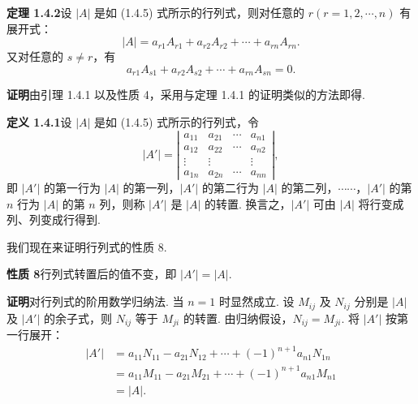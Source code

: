 \documentclass[UTF8,12pt,a4paper,fontset=fandol]{ctexart}
\begin{document}
\noindent\textbf{定理 1.4.2}\quad 设 $|A|$ 是如 (1.4.5) 式所示的行列式，则对任意的 $r(r=1,2,\cdots,n)$ 有展开式：
\begin{equation}
|A|=a_{r1}A_{r1}+a_{r2}A_{r2}+\cdots+a_{rn}A_{rn}.
\tag{1.4.6}
\end{equation}
又对任意的 $s\ne r$，有
\begin{equation}
a_{r1}A_{s1}+a_{r2}A_{s2}+\cdots+a_{rn}A_{sn}=0.
\tag{1.4.7}
\end{equation}

\noindent\textbf{证明}\quad 由引理 1.4.1 以及性质 4，采用与定理 1.4.1 的证明类似的方法即得.

\noindent\textbf{定义 1.4.1}\quad 设 $|A|$ 是如 (1.4.5) 式所示的行列式，令
\[
|A'|=
\left|\begin{array}{cccc}
a_{11} & a_{21} & \cdots & a_{n1}\\
a_{12} & a_{22} & \cdots & a_{n2}\\
\vdots & \vdots & & \vdots\\
a_{1n} & a_{2n} & \cdots & a_{nn}
\end{array}\right|,
\]
即 $|A'|$ 的第一行为 $|A|$ 的第一列，$|A'|$ 的第二行为 $|A|$ 的第二列，$\cdots\cdots$，$|A'|$ 的第 $n$ 行为 $|A|$ 的第 $n$ 列，则称 $|A'|$ 是 $|A|$ 的转置. 换言之，$|A'|$ 可由 $|A|$ 将行变成列、列变成行得到.

我们现在来证明行列式的性质 8.

\noindent\textbf{性质 8}\quad 行列式转置后的值不变，即 $|A'|=|A|$.

\noindent\textbf{证明}\quad 对行列式的阶用数学归纳法. 当 $n=1$ 时显然成立. 设 $M_{ij}$ 及 $N_{ij}$ 分别是 $|A|$ 及 $|A'|$ 的余子式，则 $N_{ij}$ 等于 $M_{ji}$ 的转置. 由归纳假设，$N_{ij}=M_{ji}$. 将 $|A'|$ 按第一行展开：
\[
\begin{aligned}
|A'|
&=a_{11}N_{11}-a_{21}N_{12}+\cdots+(-1)^{n+1}a_{n1}N_{1n}\\
&=a_{11}M_{11}-a_{21}M_{21}+\cdots+(-1)^{n+1}a_{n1}M_{n1}\\
&=|A|.
\end{aligned}
\]
\end{document}
